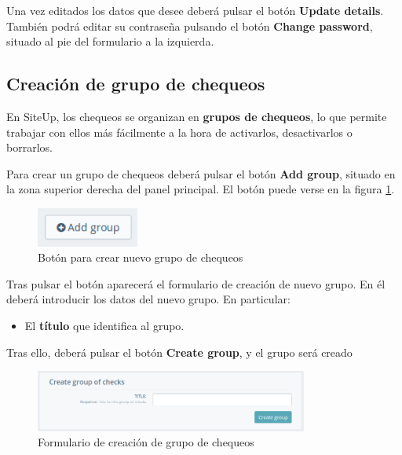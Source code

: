 Una vez editados los datos que desee deberá pulsar el botón \textbf{Update
  details}. También podrá editar su contraseña pulsando el botón \textbf{Change
  password}, situado al pie del formulario a la izquierda.


\subsection{Creación de grupo de chequeos}

En SiteUp, los chequeos se organizan en \textbf{grupos de chequeos}, lo que
permite trabajar con ellos más fácilmente a la hora de activarlos, desactivarlos
o borrarlos. 

Para crear un grupo de chequeos deberá pulsar el botón \textbf{Add group},
situado en la zona superior derecha del panel principal. El botón puede verse en
la figura \ref{fig:crear-grupo}.

\begin{figure}[hbtp]
  \centering
  \includegraphics[width=0.3\textwidth]{apendice_manual_usuario/grupo_boton_nuevo.png}
  \caption{Botón para crear nuevo grupo de chequeos}
  \label{fig:crear-grupo}
\end{figure}

Tras pulsar el botón aparecerá el formulario de creación de nuevo grupo. En él
deberá introducir los datos del nuevo grupo. En particular:

\begin{itemize}
\item El \textbf{título} que identifica al grupo.
\end{itemize}

Tras ello, deberá pulsar el botón \textbf{Create group}, y el grupo será creado

\begin{figure}[H]
  \centering
  \includegraphics[width=0.8\textwidth]{apendice_manual_usuario/grupo_formulario_crear.png}
  \caption{Formulario de creación de grupo de chequeos}
  \label{fig:}
\end{figure}


